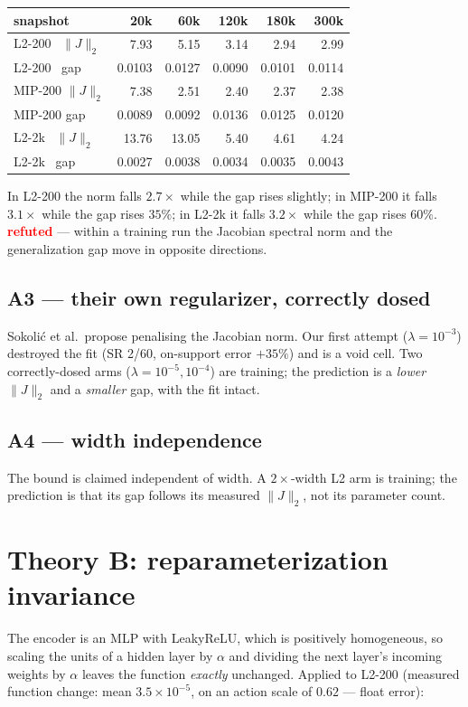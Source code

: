 \documentclass[10pt]{article}
\newcommand{\no}{\textcolor{red}{\textbf{refuted}}}
\begin{document}
\begin{center}\small
\begin{tabular}{lrrrrr}
\toprule
snapshot & 20k & 60k & 120k & 180k & 300k \\
\midrule
L2-200 \ $\|J\|_2$ & 7.93 & 5.15 & 3.14 & 2.94 & 2.99 \\
L2-200 \ gap       & 0.0103 & 0.0127 & 0.0090 & 0.0101 & 0.0114 \\
MIP-200 $\|J\|_2$  & 7.38 & 2.51 & 2.40 & 2.37 & 2.38 \\
MIP-200 gap        & 0.0089 & 0.0092 & 0.0136 & 0.0125 & 0.0120 \\
L2-2k \ $\|J\|_2$  & 13.76 & 13.05 & 5.40 & 4.61 & 4.24 \\
L2-2k \ gap        & 0.0027 & 0.0038 & 0.0034 & 0.0035 & 0.0043 \\
\bottomrule
\end{tabular}
\end{center}

In L2-200 the norm falls $2.7\times$ while the gap rises slightly; in
MIP-200 it falls $3.1\times$ while the gap rises $35\%$; in L2-2k it
falls $3.2\times$ while the gap rises $60\%$. \no{} --- within a training
run the Jacobian spectral norm and the generalization gap move in
opposite directions.

\subsection*{A3 --- their own regularizer, correctly dosed}
Sokoli\'c et al.\ propose penalising the Jacobian norm. Our first attempt
($\lambda=10^{-3}$) destroyed the fit (SR 2/60, on-support error $+35\%$)
and is a void cell. Two correctly-dosed arms ($\lambda = 10^{-5},
10^{-4}$) are training; the prediction is a \emph{lower} $\|J\|_2$ and a
\emph{smaller} gap, with the fit intact.

\subsection*{A4 --- width independence}
The bound is claimed independent of width. A $2\times$-width L2 arm is
training; the prediction is that its gap follows its measured $\|J\|_2$,
not its parameter count.

\section{Theory B: reparameterization invariance}

The encoder is an MLP with LeakyReLU, which is positively homogeneous, so
scaling the units of a hidden layer by $\alpha$ and dividing the next
layer's incoming weights by $\alpha$ leaves the function \emph{exactly}
unchanged. Applied to L2-200 (measured function change: mean
$3.5\times10^{-5}$, on an action scale of $0.62$ --- float error):
\end{document}

